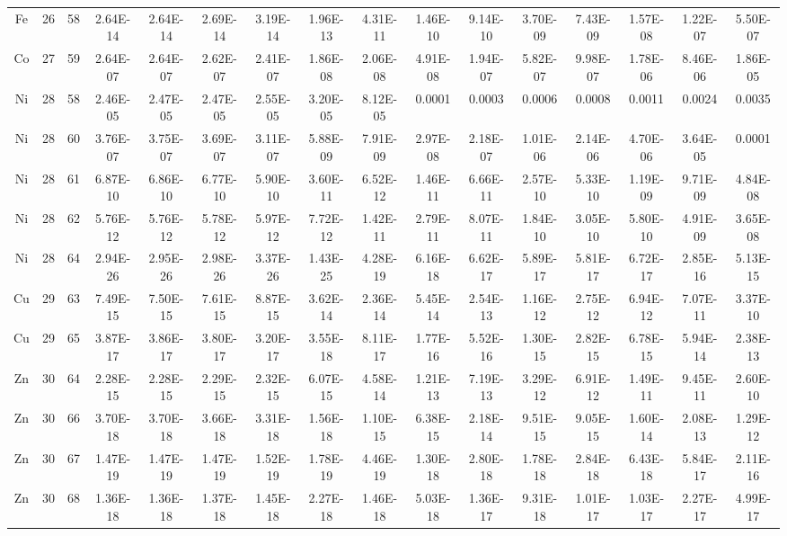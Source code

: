 {\begin{tabular}{|c|c|c|c|c|c|c|c|c|c|c|c|c|c|c|c|}
Fe & 26 & 58   & 2.64E-14  & 2.64E-14  & 2.69E-14  & 3.19E-14  & 1.96E-13  & 4.31E-11  & 1.46E-10  & 9.14E-10  & 3.70E-09  & 7.43E-09  & 1.57E-08  & 1.22E-07  & 5.50E-07  \\
Co & 27 & 59   & 2.64E-07  & 2.64E-07  & 2.62E-07  & 2.41E-07  & 1.86E-08  & 2.06E-08  & 4.91E-08  & 1.94E-07  & 5.82E-07  & 9.98E-07  & 1.78E-06  & 8.46E-06  & 1.86E-05  \\
Ni & 28 & 58   & 2.46E-05  & 2.47E-05  & 2.47E-05  & 2.55E-05  & 3.20E-05  & 8.12E-05  & 0.0001    & 0.0003    & 0.0006    & 0.0008    & 0.0011    & 0.0024    & 0.0035    \\
Ni & 28 & 60   & 3.76E-07  & 3.75E-07  & 3.69E-07  & 3.11E-07  & 5.88E-09  & 7.91E-09  & 2.97E-08  & 2.18E-07  & 1.01E-06  & 2.14E-06  & 4.70E-06  & 3.64E-05  & 0.0001    \\
Ni & 28 & 61   & 6.87E-10  & 6.86E-10  & 6.77E-10  & 5.90E-10  & 3.60E-11  & 6.52E-12  & 1.46E-11  & 6.66E-11  & 2.57E-10  & 5.33E-10  & 1.19E-09  & 9.71E-09  & 4.84E-08  \\
Ni & 28 & 62   & 5.76E-12  & 5.76E-12  & 5.78E-12  & 5.97E-12  & 7.72E-12  & 1.42E-11  & 2.79E-11  & 8.07E-11  & 1.84E-10  & 3.05E-10  & 5.80E-10  & 4.91E-09  & 3.65E-08  \\
Ni & 28 & 64   & 2.94E-26  & 2.95E-26  & 2.98E-26  & 3.37E-26  & 1.43E-25  & 4.28E-19  & 6.16E-18  & 6.62E-17  & 5.89E-17  & 5.81E-17  & 6.72E-17  & 2.85E-16  & 5.13E-15  \\
Cu & 29 & 63   & 7.49E-15  & 7.50E-15  & 7.61E-15  & 8.87E-15  & 3.62E-14  & 2.36E-14  & 5.45E-14  & 2.54E-13  & 1.16E-12  & 2.75E-12  & 6.94E-12  & 7.07E-11  & 3.37E-10  \\
Cu & 29 & 65   & 3.87E-17  & 3.86E-17  & 3.80E-17  & 3.20E-17  & 3.55E-18  & 8.11E-17  & 1.77E-16  & 5.52E-16  & 1.30E-15  & 2.82E-15  & 6.78E-15  & 5.94E-14  & 2.38E-13  \\
Zn & 30 & 64   & 2.28E-15  & 2.28E-15  & 2.29E-15  & 2.32E-15  & 6.07E-15  & 4.58E-14  & 1.21E-13  & 7.19E-13  & 3.29E-12  & 6.91E-12  & 1.49E-11  & 9.45E-11  & 2.60E-10  \\
Zn & 30 & 66   & 3.70E-18  & 3.70E-18  & 3.66E-18  & 3.31E-18  & 1.56E-18  & 1.10E-15  & 6.38E-15  & 2.18E-14  & 9.51E-15  & 9.05E-15  & 1.60E-14  & 2.08E-13  & 1.29E-12  \\
Zn & 30 & 67   & 1.47E-19  & 1.47E-19  & 1.47E-19  & 1.52E-19  & 1.78E-19  & 4.46E-19  & 1.30E-18  & 2.80E-18  & 1.78E-18  & 2.84E-18  & 6.43E-18  & 5.84E-17  & 2.11E-16  \\
Zn & 30 & 68   & 1.36E-18  & 1.36E-18  & 1.37E-18  & 1.45E-18  & 2.27E-18  & 1.46E-18  & 5.03E-18  & 1.36E-17  & 9.31E-18  & 1.01E-17  & 1.03E-17  & 2.27E-17  & 4.99E-17  \\

\end{tabular}}
